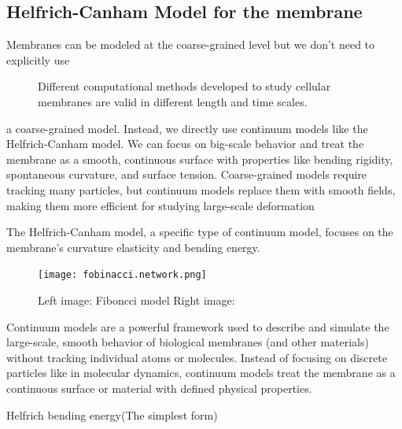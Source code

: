 \documentclass[12pt]{article}
\begin{document}
\begin{flushleft}
\vspace{-1em} 
\subsection*{Helfrich-Canham Model for the membrane}
\setlength{\parindent}{45pt}

Membranes can be modeled at the coarse-grained level but we don't need to explicitly use 

\begin{figure}[!ht]
  \centering
  \caption{Different computational methods developed to study cellular membranes are valid in different length and time scales.\cite{chabanon2017systems}}
\end{figure}





\noindent a coarse-grained model. Instead, we directly use continuum models like the Helfrich-Canham model. We can focus on big-scale behavior and treat the membrane as a smooth, continuous surface with properties like bending rigidity, spontaneous curvature, and surface tension. Coarse-grained models require tracking many particles, but continuum models replace them with smooth fields, making them more efficient for studying large-scale deformation








\setlength{\parindent}{4em}The Helfrich-Canham model, a specific type of continuum model, focuses on the membrane's curvature elasticity and bending energy\cite{Bassereau2014}.




\begin{figure}[!ht]
  \centering
  \texttt{[image: fobinacci.network.png]} 
  \caption{Left image: Fiboncci model  Right image: }
\end{figure}

Continuum models are a powerful framework used to describe and simulate the large-scale, smooth behavior of biological membranes (and other materials) without tracking individual atoms or molecules. Instead of focusing on discrete particles like in molecular dynamics, continuum models treat the membrane as a continuous surface or material with defined physical properties.



 

Helfrich bending energy(The simplest form)


\end{flushleft}
\end{document}
